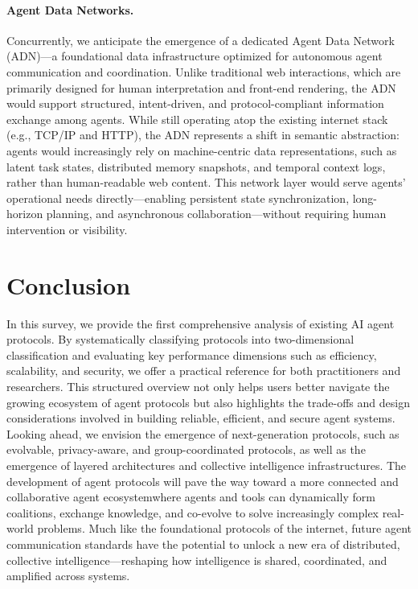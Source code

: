 \documentclass[10pt,preprint]{article}
\begin{document}
\paragraph{Agent Data Networks.}

Concurrently, we anticipate the emergence of a dedicated Agent Data Network (ADN)—a foundational data infrastructure optimized for autonomous agent communication and coordination. Unlike traditional web interactions, which are primarily designed for human interpretation and front-end rendering, the ADN would support structured, intent-driven, and protocol-compliant information exchange among agents. While still operating atop the existing internet stack (e.g., TCP/IP and HTTP), the ADN represents a shift in semantic abstraction: agents would increasingly rely on machine-centric data representations, such as latent task states, distributed memory snapshots, and temporal context logs, rather than human-readable web content. This network layer would serve agents' operational needs directly—enabling persistent state synchronization, long-horizon planning, and asynchronous collaboration—without requiring human intervention or visibility.


\section{Conclusion}
In this survey, we provide the first comprehensive analysis of existing AI agent protocols. 
By systematically classifying protocols into two-dimensional classification and evaluating key performance dimensions such as efficiency, scalability, and security, we offer a practical reference for both practitioners and researchers. 
This structured overview not only helps users better navigate the growing ecosystem of agent protocols but also highlights the trade-offs and design considerations involved in building reliable, efficient, and secure agent systems.
Looking ahead, we envision the emergence of next-generation protocols, such as evolvable, privacy-aware, and group-coordinated protocols, as well as the emergence of layered architectures and collective intelligence infrastructures.
The development of agent protocols will pave the way toward a more connected and collaborative agent ecosystemwhere agents and tools can dynamically form coalitions, exchange knowledge, and co-evolve to solve increasingly complex real-world problems. 
Much like the foundational protocols of the internet, future agent communication standards have the potential to unlock a new era of distributed, collective intelligence---reshaping how intelligence is shared, coordinated, and amplified across systems.
\end{document}
